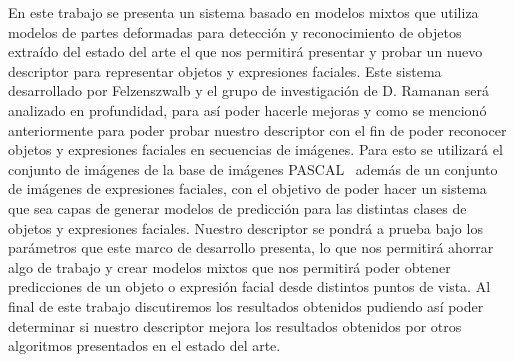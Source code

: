 \documentclass[final]{udpthesis}
\theoremstyle{definition}
\begin{document}
\begin{resumen}

En este trabajo se presenta un sistema basado en modelos mixtos que utiliza modelos de partes deformadas para detección y reconocimiento de objetos extraído del estado del arte el que nos permitirá presentar y probar un nuevo descriptor para representar objetos y expresiones faciales. Este sistema~\cite{Felzenszwalb2008,Felzenszwalb2010,Felzenszwalb2013} desarrollado por Felzenszwalb y el grupo de investigación de D. Ramanan será analizado en profundidad, para así poder hacerle mejoras y como se mencionó anteriormente para poder probar nuestro descriptor con el fin de poder reconocer objetos y expresiones faciales en secuencias de imágenes. Para esto se utilizará el conjunto de imágenes de la base de imágenes PASCAL~\cite{Everingham2010} además de un conjunto de imágenes de expresiones faciales, con el objetivo de poder hacer un sistema que sea capas de generar modelos de predicción para las distintas clases de objetos y expresiones faciales. Nuestro descriptor se pondrá a prueba bajo los parámetros que este marco de desarrollo presenta, lo que nos permitirá ahorrar algo de trabajo y crear modelos mixtos que nos permitirá poder obtener predicciones de un objeto o expresión facial desde distintos puntos de vista. Al final de este trabajo discutiremos los resultados obtenidos pudiendo así poder determinar si nuestro descriptor mejora los resultados obtenidos por otros algoritmos presentados en el estado del arte.
\end{resumen}


\mainmatter








\backmatter



\appendix

%
\end{document}
